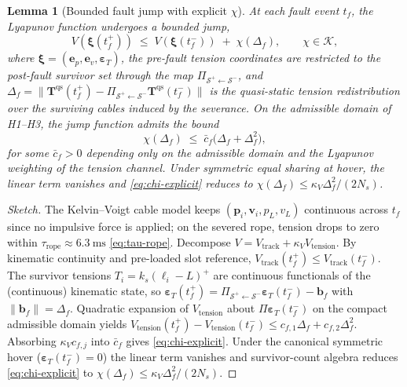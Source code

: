 \documentclass[10pt,a4paper]{amsart}
\newtheorem{lemma}{Lemma}
\newcommand{\vect}[1]{\boldsymbol{#1}}
\begin{document}
\begin{lemma}[Bounded fault jump with explicit $\chi$]
\label{lem:jump-continuity}
At each fault event $t_f$, the Lyapunov function undergoes a
bounded jump,
\begin{equation}
  V(\vect\xi(t_f^+))
    \;\le\;
    V(\vect\xi(t_f^-))
    \;+\; \chi(\Delta_f),
  \qquad
  \chi \in \mathcal{K},
  \label{eq:jump-bound}
\end{equation}
where $\vect\xi = (\vect e_p, \vect e_v, \vect\varepsilon_T)$, the pre-fault tension coordinates are restricted to the
post-fault survivor set through the map
$\Pi_{\mathcal{S}^+\leftarrow\mathcal{S}^-}$, and
$\Delta_f = \|\vect T^{\mathrm{qs}}(t_f^+) -
\Pi_{\mathcal{S}^+\leftarrow\mathcal{S}^-}
\vect T^{\mathrm{qs}}(t_f^-)\|$ is the quasi-static tension
redistribution over the surviving cables induced by the
severance. On the admissible domain of H1--H3, the jump
function admits the bound
\begin{equation}
  \chi(\Delta_f)
    \;\le\;
    \bar c_f\bigl(\Delta_f + \Delta_f^2\bigr),
  \label{eq:chi-explicit}
\end{equation}
for some $\bar c_f > 0$ depending only on the admissible
domain and the Lyapunov weighting of the tension channel.
Under symmetric equal sharing at hover, the linear term
vanishes and \eqref{eq:chi-explicit} reduces to
$\chi(\Delta_f) \le \kappa_V\Delta_f^2/(2N_s)$.
\end{lemma}

\begin{proof}[Sketch]
The Kelvin--Voigt cable model keeps $(\vect p_i,\vect v_i,p_L,v_L)$ continuous across $t_f$ since no impulsive force is applied; on the severed rope, tension drops to zero within $\tau_{\mathrm{rope}}\approx\SI{6.3}{\milli\second}$ \eqref{eq:tau-rope}. Decompose $V=V_{\mathrm{track}}+\kappa_V V_{\mathrm{tension}}$. By kinematic continuity and pre-loaded slot reference, $V_{\mathrm{track}}(t_f^+)\le V_{\mathrm{track}}(t_f^-)$. The survivor tensions $T_i=k_s(\ell_i-L)^+$ are continuous functionals of the (continuous) kinematic state, so $\vect\varepsilon_T(t_f^+)=\Pi_{\mathcal{S}^+\leftarrow\mathcal{S}^-}\vect\varepsilon_T(t_f^-)-\vect b_f$ with $\|\vect b_f\|=\Delta_f$. Quadratic expansion of $V_{\mathrm{tension}}$ about $\Pi\vect\varepsilon_T(t_f^-)$ on the compact admissible domain yields $V_{\mathrm{tension}}(t_f^+)-V_{\mathrm{tension}}(t_f^-)\le c_{f,1}\Delta_f+c_{f,2}\Delta_f^2$. Absorbing $\kappa_V c_{f,j}$ into $\bar c_f$ gives \eqref{eq:chi-explicit}. Under the canonical symmetric hover ($\vect\varepsilon_T(t_f^-)=0$) the linear term vanishes and survivor-count algebra reduces \eqref{eq:chi-explicit} to $\chi(\Delta_f)\le\kappa_V\Delta_f^2/(2N_s)$.
\end{proof}
\end{document}
